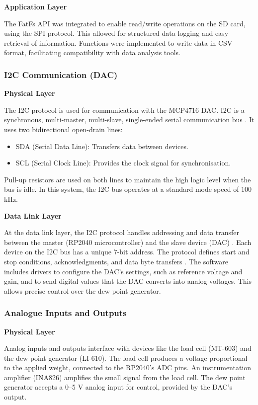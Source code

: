 \textbf{Application Layer}

The FatFs API was integrated to enable read/write operations on the SD card, 
using the SPI protocol. This allowed for structured data logging and easy retrieval of information. 
Functions were implemented to write data in CSV format, facilitating compatibility with data analysis tools.

\subsubsection{I2C Communication (DAC)}

\textbf{Physical Layer}

The I2C protocol is used for communication with the MCP4716 DAC. I2C is a synchronous, multi-master, 
multi-slave, single-ended serial communication bus \cite{DAC_datasheet}. It uses two bidirectional open-drain lines:
\begin{itemize}
    \item SDA (Serial Data Line): Transfers data between devices.
    \item SCL (Serial Clock Line): Provides the clock signal for synchronisation.
\end{itemize}
Pull-up resistors are used on both lines to maintain the high logic level when the bus is idle. 
In this system, the I2C bus operates at a standard mode speed of 100 kHz.

\textbf{Data Link Layer}

At the data link layer, the I2C protocol handles addressing and data transfer between the master 
(RP2040 microcontroller) and the slave device (DAC) \cite{DAC_datasheet}. Each device on the I2C bus has a unique 7-bit address. 
The protocol defines start and stop conditions, acknowledgments, and data byte transfers \cite{DAC_datasheet}. The software includes drivers to configure the DAC's settings, such as reference voltage and gain, and to send digital values that the DAC converts into analog voltages. This allows precise control over the dew point generator.

\subsubsection{Analogue Inputs and Outputs}

\textbf{Physical Layer}

Analog inputs and outputs interface with devices like the load cell (MT-603) and the dew point generator (LI-610). The load cell produces a voltage proportional to the applied weight, connected to the RP2040's ADC pins. An instrumentation amplifier (INA826) amplifies the small signal from the load cell. The dew point generator accepts a 0–5 V analog input for control, provided by the DAC's output.

